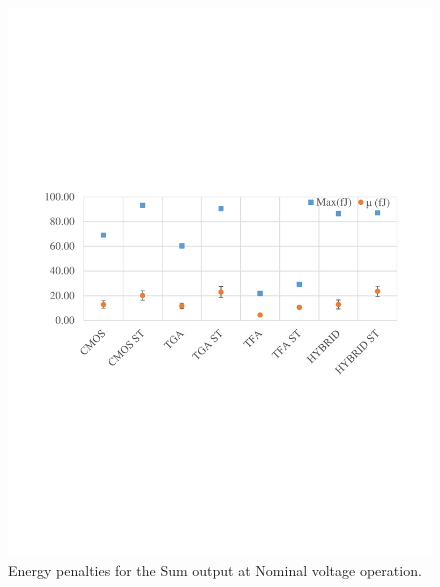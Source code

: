 \documentclass[ecp,tc, english]{iiufrgs}
\begin{document}
\begin{figure}[H]
\centering
\includegraphics[width=\textwidth, trim={0 9cm 0 9cm},clip]{energyNominalSum.pdf}
\caption{Energy penalties for the Sum output at Nominal voltage operation.}
\label{fig:energyNS}
\end{figure}
\end{document}
